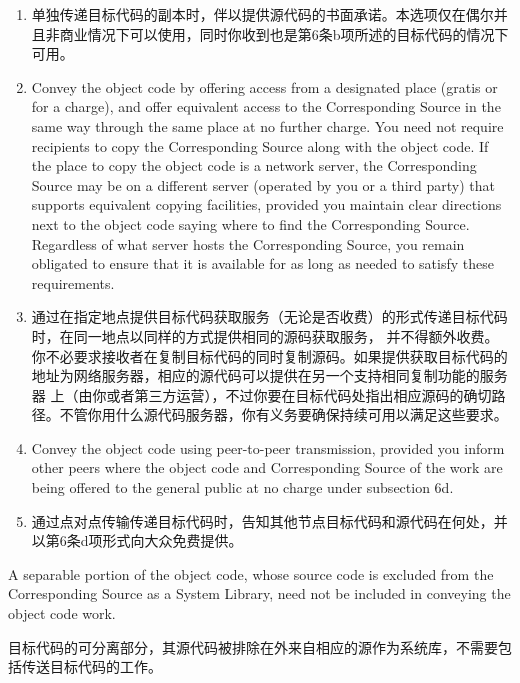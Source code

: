 \documentclass[11pt]{article}
\begin{document}
\begin{enumerate}
\begin{enumerate}
  \item 单独传递目标代码的副本时，伴以提供源代码的书面承诺。本选项仅在偶尔并且非商业情况下可以使用，同时你收到也是第6条b项所述的目标代码的情况下可用。
  
  \item Convey the object code by offering access from a designated
  place (gratis or for a charge), and offer equivalent access to the
  Corresponding Source in the same way through the same place at no
  further charge.  You need not require recipients to copy the
  Corresponding Source along with the object code.  If the place to
  copy the object code is a network server, the Corresponding Source
  may be on a different server (operated by you or a third party)
  that supports equivalent copying facilities, provided you maintain
  clear directions next to the object code saying where to find the
  Corresponding Source.  Regardless of what server hosts the
  Corresponding Source, you remain obligated to ensure that it is
  available for as long as needed to satisfy these requirements.

  \item 通过在指定地点提供目标代码获取服务（无论是否收费）的形式传递目标代码时，在同一地点以同样的方式提供相同的源码获取服务，
  并不得额外收费。你不必要求接收者在复制目标代码的同时复制源码。如果提供获取目标代码的地址为网络服务器，相应的源代码可以提供在另一个支持相同复制功能的服务器
  上（由你或者第三方运营），不过你要在目标代码处指出相应源码的确切路径。不管你用什么源代码服务器，你有义务要确保持续可用以满足这些要求。

  \item Convey the object code using peer-to-peer transmission, provided
  you inform other peers where the object code and Corresponding
  Source of the work are being offered to the general public at no
  charge under subsection 6d.
  \item 通过点对点传输传递目标代码时，告知其他节点目标代码和源代码在何处，并以第6条d项形式向大众免费提供。

  \end{enumerate}

A separable portion of the object code, whose source code is excluded
from the Corresponding Source as a System Library, need not be
included in conveying the object code work.

目标代码的可分离部分，其源代码被排除在外来自相应的源作为系统库，不需要包括传送目标代码的工作。


\end{enumerate}
\end{document}
